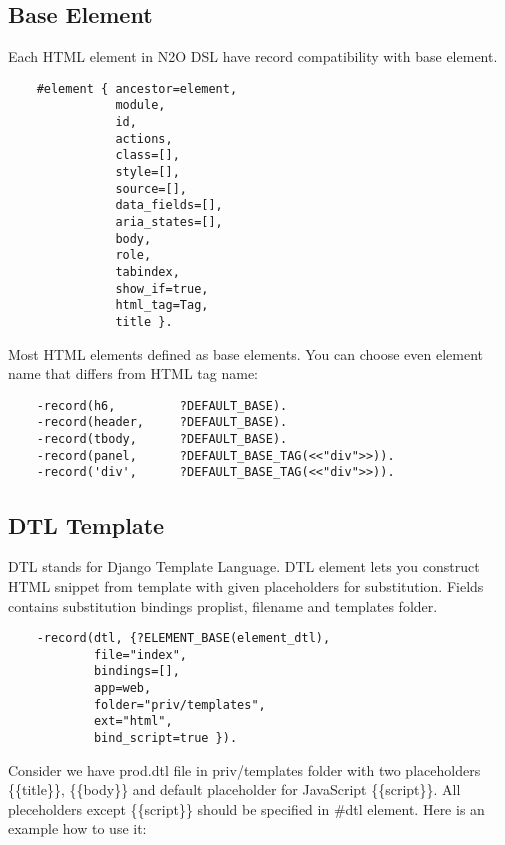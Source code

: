 \subsection{Base Element}
Each HTML element in N2O DSL have record compatibility with base element.

\vspace{1\baselineskip}
\begin{lstlisting}
    #element { ancestor=element,
               module,
               id,
               actions,
               class=[],
               style=[],
               source=[],
               data_fields=[],
               aria_states=[],
               body,
               role,
               tabindex,
               show_if=true,
               html_tag=Tag,
               title }.
\end{lstlisting}
\vspace{1\baselineskip}

Most HTML elements defined as base elements. You can choose even element
name that differs from HTML tag name:

\vspace{1\baselineskip}
\begin{lstlisting}
    -record(h6,         ?DEFAULT_BASE).
    -record(header,     ?DEFAULT_BASE).
    -record(tbody,      ?DEFAULT_BASE).
    -record(panel,      ?DEFAULT_BASE_TAG(<<"div">>)).
    -record('div',      ?DEFAULT_BASE_TAG(<<"div">>)).
\end{lstlisting}
\vspace{1\baselineskip}

\newpage
\subsection{DTL Template}
DTL stands for Django Template Language. DTL element lets you construct HTML
snippet from template with given placeholders for substitution.
Fields contains substitution bindings proplist, filename and templates folder.

\vspace{1\baselineskip}
\begin{lstlisting}
    -record(dtl, {?ELEMENT_BASE(element_dtl),
            file="index",
            bindings=[],
            app=web,
            folder="priv/templates",
            ext="html",
            bind_script=true }).
\end{lstlisting}
\vspace{1\baselineskip}

Consider we have prod.dtl file in priv/templates folder with two
placeholders \{\{title\}\}, \{\{body\}\} and default placeholder for JavaScript \{\{script\}\}.
All pleceholders except \{\{script\}\} should be specified in \#dtl element.
Here is an example how to use it:

